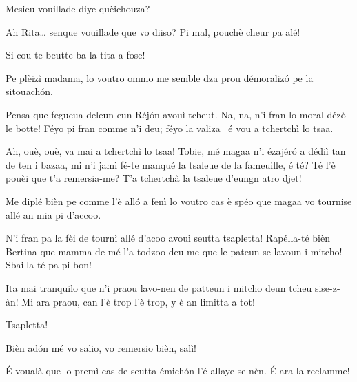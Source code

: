 \begin{drama}
\Ritaspeaks {} Mesieu vouillade diye quèichouza?

\Tobiespeaks Ah Rita\ldots {} senque vouillade que vo diiso? Pi mal, pouchè cheur pa alé!

\Bertinaspeaks Si cou te beutte ba la tita a fose!

\Ritaspeaks Pe plèizì madama, lo voutro ommo me semble dza prou démoralizó pe la sitouachón.

\Tobiespeaks Pensa que fegueua deleun eun Réjón avouì tcheut. Na, na, n’i fran lo moral dézò le botte! Féyo pi fran comme n’i deu; féyo la valiza \valigia\ é vou a tchertchì lo tsaa.

\Bertinaspeaks Ah, ouè, ouè, va mai a tchertchì lo tsaa! Tobie, mé magaa n’i ézajéró a dédiì tan de ten i bazaa, mi n’i jamì fé-te manqué la tsaleue de la fameuille, é té? Té l’è pouèi que t’a remersia-me? T’a tchertchà la tsaleue d’eungn atro djet!

\Ritaspeaks Me diplé bièn pe comme l’è alló a fenì lo voutro cas è spéo que magaa vo tournise allé an mia pi d’accoo.

\Tobiespeaks N’i fran pa la fèi de tournì allé d’acoo avouì seutta tsapletta! Rapélla-té bièn Bertina que mamma de mé l’a todzoo deu-me que le pateun se lavoun i mitcho! Sbailla-té pa pi bon!

\Bertinaspeaks Ita mai tranquilo que n’i praou lavo-nen de patteun i mitcho deun tcheu sise-z-àn! Mi ara praou, can l’è trop l’è trop, y è an limitta a tot!

\Tobiespeaks Tsapletta!

\Ritaspeaks Bièn ad\'on mé vo salio, vo remersio bièn, salì!


\Ritaspeaks É voualà que lo premì cas de seutta émichón l'é allaye-se-nèn. \'E ara la reclamme!




\end{drama}
